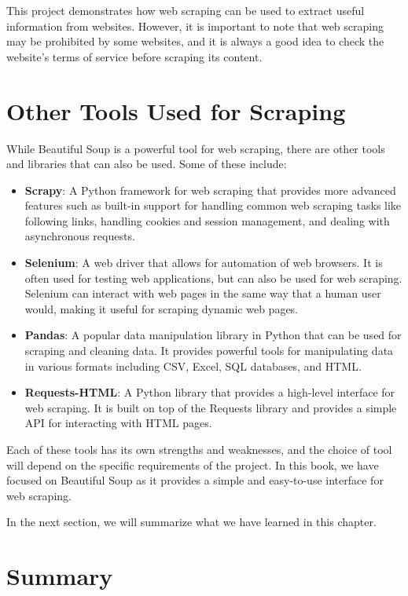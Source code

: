 \documentclass[
  paper=a4,
  ,captions=tableheading
]{scrartcl}
\begin{document}
This project demonstrates how web scraping can be used to extract useful
information from websites. However, it is important to note that web
scraping may be prohibited by some websites, and it is always a good
idea to check the website's terms of service before scraping its
content.

\hypertarget{other-tools-used-for-scraping}{%
\section{Other Tools Used for
Scraping}\label{other-tools-used-for-scraping}}

While Beautiful Soup is a powerful tool for web scraping, there are
other tools and libraries that can also be used. Some of these include:

\begin{itemize}
\item
  \textbf{Scrapy}: A Python framework for web scraping that provides
  more advanced features such as built-in support for handling common
  web scraping tasks like following links, handling cookies and session
  management, and dealing with asynchronous requests.
\item
  \textbf{Selenium}: A web driver that allows for automation of web
  browsers. It is often used for testing web applications, but can also
  be used for web scraping. Selenium can interact with web pages in the
  same way that a human user would, making it useful for scraping
  dynamic web pages.
\item
  \textbf{Pandas}: A popular data manipulation library in Python that
  can be used for scraping and cleaning data. It provides powerful tools
  for manipulating data in various formats including CSV, Excel, SQL
  databases, and HTML.
\item
  \textbf{Requests-HTML}: A Python library that provides a high-level
  interface for web scraping. It is built on top of the Requests library
  and provides a simple API for interacting with HTML pages.
\end{itemize}

Each of these tools has its own strengths and weaknesses, and the choice
of tool will depend on the specific requirements of the project. In this
book, we have focused on Beautiful Soup as it provides a simple and
easy-to-use interface for web scraping.

In the next section, we will summarize what we have learned in this
chapter.

\hypertarget{summary-4}{%
\section{Summary}\label{summary-4}}
\end{document}
